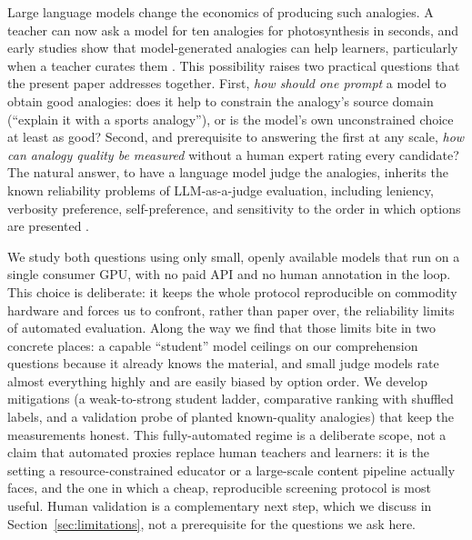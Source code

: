 \documentclass[11pt]{article}
\begin{document}
Large language models change the economics of producing such analogies. A teacher
can now ask a model for ten analogies for photosynthesis in seconds, and early
studies show that model-generated analogies can help learners, particularly when
a teacher curates them \citep{bhavya2022analogy,shao2025unlocking}. This
possibility raises two practical questions that the present paper addresses
together. First, \emph{how should one prompt} a model to obtain good analogies:
does it help to constrain the analogy's source domain (``explain it with a sports
analogy''), or is the model's own unconstrained choice at least as good? Second,
and prerequisite to answering the first at any scale, \emph{how can analogy
quality be measured} without a human expert rating every candidate? The natural
answer, to have a language model judge the analogies, inherits the known
reliability problems of LLM-as-a-judge evaluation, including leniency, verbosity
preference, self-preference, and sensitivity to the order in which options are
presented \citep{zheng2023judging}.

We study both questions using only small, openly available models that run on a
single consumer GPU, with no paid API and no human annotation in the loop. This
choice is deliberate: it keeps the whole protocol reproducible on commodity
hardware and forces us to confront, rather than paper over, the reliability limits
of automated evaluation. Along the way we find that those limits bite in two
concrete places: a capable ``student'' model ceilings on our comprehension
questions because it already knows the material, and small judge models rate
almost everything highly and are easily biased by option order. We develop
mitigations (a weak-to-strong student ladder, comparative ranking with shuffled
labels, and a validation probe of planted known-quality analogies) that keep the
measurements honest. This fully-automated regime is a deliberate scope, not a claim
that automated proxies replace human teachers and learners: it is the setting a
resource-constrained educator or a large-scale content pipeline actually faces, and the
one in which a cheap, reproducible screening protocol is most useful. Human validation is
a complementary next step, which we discuss in Section~\ref{sec:limitations}, not a
prerequisite for the questions we ask here.
\end{document}
